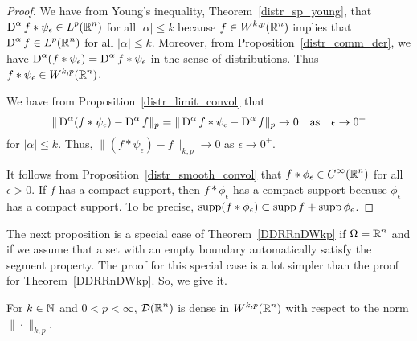 \begin{proof}
We have from Young's inequality,
Theorem~\ref{distr_sp_young}, that
$\displaystyle \operatorname{D}^\alpha f \ast \psi_\epsilon \in L^p(\mathbb{R}^n)$ for all
$|\alpha|\leq k$ because $\displaystyle f \in W^{k,p}(\mathbb{R}^n)$ implies that
$\displaystyle \operatorname{D}^\alpha f \in L^p(\mathbb{R}^n)$ for all $|\alpha|\leq k$.
Moreover, from Proposition~\ref{distr_comm_der}, we have
$\displaystyle \operatorname{D}^\alpha(f \ast \psi_\epsilon) =  \operatorname{D}^\alpha f
\ast \psi_\epsilon$ in the sense of distributions.  Thus
$\displaystyle f \ast \psi_\epsilon \in W^{k,p}(\mathbb{R}^n)$.

We have from Proposition~\ref{distr_limit_convol} that
\[
\| \operatorname{D}^\alpha(f \ast \psi_\epsilon) - \operatorname{D}^\alpha f \|_{p}
= \| \operatorname{D}^\alpha f \ast \psi_\epsilon - \operatorname{D}^\alpha f \|_{p}
\rightarrow 0 \quad \text{as}\quad \epsilon \rightarrow 0^+
\]
for $|\alpha|\leq k$.  Thus,
$\displaystyle \| (f \ast \psi_\epsilon) - f \|_{k,p} \rightarrow 0$
as $\epsilon \rightarrow 0^+$.

It follows from Proposition~\ref{distr_smooth_convol} that
$\displaystyle f \ast \phi_{\epsilon} \in C^\infty(\mathbb{R}^n)$ for all $\epsilon>0$.
If $f$ has a compact support, then $f \ast \phi_{\epsilon}$ has a
compact support because $\phi_\epsilon$ has a compact support.  To be
precise,
$\operatorname{supp} (f \ast \phi_{\epsilon}) \subset \operatorname{supp} f + \operatorname{supp} \phi_{\epsilon}$.
\end{proof}

The next proposition is a special case of Theorem~\ref{DDRRnDWkp} if
$\displaystyle \Omega = \mathbb{R}^n$ and if we assume that a set with an
empty boundary automatically satisfy the segment property.  The proof
for this special case is a lot simpler than the proof for
Theorem~\ref{DDRRnDWkp}.  So, we give it.

\begin{prop} \label{DDRRnDWkpV2}
For $k\in \mathbb{N}$ and $0 < p < \infty$, $\displaystyle \mathcal{D}(\mathbb{R}^n)$ is dense in
$\displaystyle W^{k,p}(\mathbb{R}^n)$ with respect to the norm $\|\cdot\|_{k,p}$.
\end{prop}

